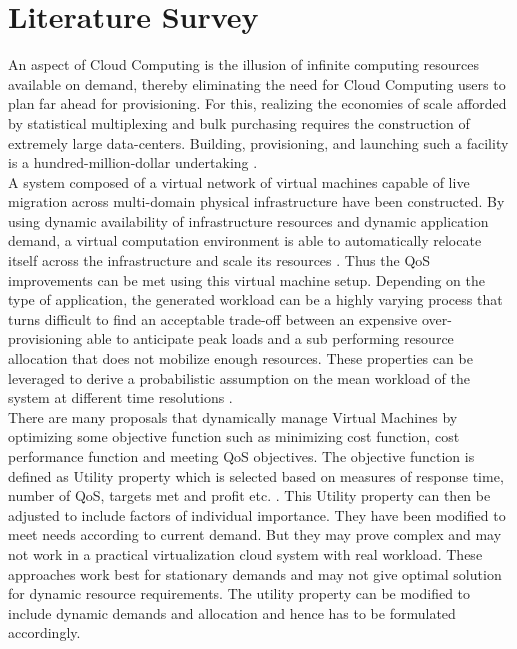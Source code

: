 \chapter{Literature Survey}
An aspect of Cloud Computing is the illusion of infinite computing resources available on demand, thereby eliminating the need for Cloud Computing users to plan far ahead for provisioning. For this, realizing the economies of scale afforded by statistical multiplexing and bulk purchasing requires the construction of extremely large data-centers. Building, provisioning, and launching such a facility is a hundred-million-dollar undertaking \cite{Berkeley}.\\[0.2cm]
A system composed of a virtual network of virtual machines capable of live migration across multi-domain physical infrastructure have been constructed. By using dynamic availability of infrastructure resources and dynamic application demand, a virtual computation environment is able to automatically relocate itself across the infrastructure and scale its resources \cite{SRAS}. Thus the QoS improvements can be met using this virtual machine setup. Depending on the type of application, the generated workload can be a highly varying process that turns difficult to find an acceptable trade-off between an expensive over-provisioning able to anticipate peak loads and a sub performing resource allocation that does not mobilize enough resources. These properties can be leveraged to derive a probabilistic assumption on the mean workload of the system at different time resolutions \cite{DRMC}.\\[0.2cm]
There are many proposals that dynamically manage Virtual Machines by optimizing some objective function such as minimizing cost function, cost performance function and meeting QoS objectives. The objective function is defined as Utility property which is selected based on measures of response time, number of QoS, targets met and profit etc. \cite{SRAS}. This Utility property can then be adjusted to include factors of individual importance. They have been modified to meet needs according to current demand. But they may prove complex and  may not work in a practical virtualization cloud system with real workload. These approaches work best for stationary demands and may not give optimal solution for dynamic resource requirements. The utility property can be modified to include dynamic demands and allocation and hence has to be formulated accordingly.
